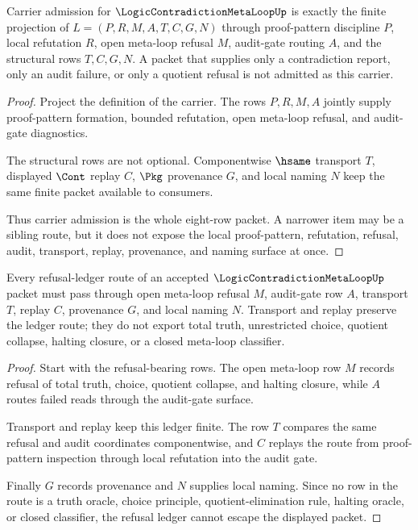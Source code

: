 \begin{theorem}
\label{thm:logic-contradiction-metaloop-carrier-admission}
Carrier admission for $\LogicContradictionMetaLoopUp$ is exactly the finite projection of $L=(P,R,M,A,T,C,G,N)$ through proof-pattern discipline $P$, local refutation $R$, open meta-loop refusal $M$, audit-gate routing $A$, and the structural rows $T,C,G,N$. A packet that supplies only a contradiction report, only an audit failure, or only a quotient refusal is not admitted as this carrier.
\end{theorem}
\begin{proof}
Project the definition of the carrier. The rows $P,R,M,A$ jointly supply proof-pattern formation, bounded refutation, open meta-loop refusal, and audit-gate diagnostics.

The structural rows are not optional. Componentwise $\hsame$ transport $T$, displayed $\Cont$ replay $C$, $\Pkg$ provenance $G$, and local naming $N$ keep the same finite packet available to consumers.

Thus carrier admission is the whole eight-row packet. A narrower item may be a sibling route, but it does not expose the local proof-pattern, refutation, refusal, audit, transport, replay, provenance, and naming surface at once.
\end{proof}

\begin{theorem}
\label{thm:logic-contradiction-metaloop-ledger-nonescape}
Every refusal-ledger route of an accepted $\LogicContradictionMetaLoopUp$ packet must pass through open meta-loop refusal $M$, audit-gate row $A$, transport $T$, replay $C$, provenance $G$, and local naming $N$. Transport and replay preserve the ledger route; they do not export total truth, unrestricted choice, quotient collapse, halting closure, or a closed meta-loop classifier.
\end{theorem}
\begin{proof}
Start with the refusal-bearing rows. The open meta-loop row $M$ records refusal of total truth, choice, quotient collapse, and halting closure, while $A$ routes failed reads through the audit-gate surface.

Transport and replay keep this ledger finite. The row $T$ compares the same refusal and audit coordinates componentwise, and $C$ replays the route from proof-pattern inspection through local refutation into the audit gate.

Finally $G$ records provenance and $N$ supplies local naming. Since no row in the route is a truth oracle, choice principle, quotient-elimination rule, halting oracle, or closed classifier, the refusal ledger cannot escape the displayed packet.
\end{proof}

